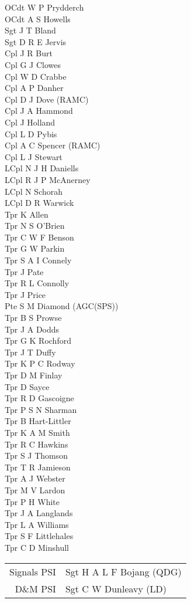 \begin{multicols}{2}
  \noindent
  OCdt W P Prydderch \\
  OCdt A S Howells \\
  Sgt J T Bland \\
  Sgt D R E Jervis \\
  Cpl J R Burt \\
  Cpl G J Clowes \\
  Cpl W D Crabbe \\
  Cpl A P Danher \\
  Cpl D J Dove (RAMC) \\
  Cpl J A Hammond \\
  Cpl J Holland \\
  Cpl L D Pybis \\
  Cpl A C Spencer (RAMC) \\
  Cpl L J Stewart \\
  LCpl N J H Daniells \\
  LCpl R J P McAnerney \\
  LCpl N Schorah \\
  LCpl D R Warwick \\
  Tpr K Allen \\
  Tpr N S O'Brien \\
  Tpr C W F Benson \\
  Tpr G W Parkin \\
  Tpr S A I Connely \\
  Tpr J Pate \\
  Tpr R L Connolly \\
  Tpr J Price \\
  Pte S M Diamond (AGC(SPS)) \\
  Tpr B S Prowse \\
  Tpr J A Dodds \\
  Tpr G K Rochford \\
  Tpr J T Duffy \\
  Tpr K P C Rodway \\
  Tpr D M Finlay \\
  Tpr D Sayce \\
  Tpr R D Gascoigne \\
  Tpr P S N Sharman \\
  Tpr B Hart-Littler \\
  Tpr K A M Smith \\
  Tpr R C Hawkins \\
  Tpr S J Thomson \\
  Tpr T R Jamieson \\
  Tpr A J Webster \\
  Tpr M V Lardon \\
  Tpr P H White \\
  Tpr J A Langlands \\
  Tpr L A Williams \\
  Tpr S F Littlehales \\
  Tpr C D Minshull \\
\end{multicols}

\begin{center}
  \begin{tabular}{rl}
    Signals PSI & Sgt H A L F Bojang (QDG) \\
    D\&M PSI & Sgt C W Dunleavy (LD) \\
  \end{tabular}
\end{center}

\begin{multicols}{2}
  \noindent
\end{multicols}
